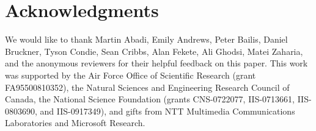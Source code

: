\section*{Acknowledgments}
We would like to thank Martin Abadi, Emily Andrews, Peter Bailis, Daniel
Bruckner, Tyson Condie, Sean Cribbs, Alan Fekete, Ali Ghodsi, Matei Zaharia, and
the anonymous reviewers for their helpful feedback on this paper.  This work was
supported by the Air Force Office of Scientific Research (grant FA95500810352),
the Natural Sciences and Engineering Research Council of Canada, the National
Science Foundation (grants CNS-0722077, IIS-0713661, IIS-0803690, and
IIS-0917349), and gifts from NTT Multimedia Communications Laboratories and
Microsoft Research.
